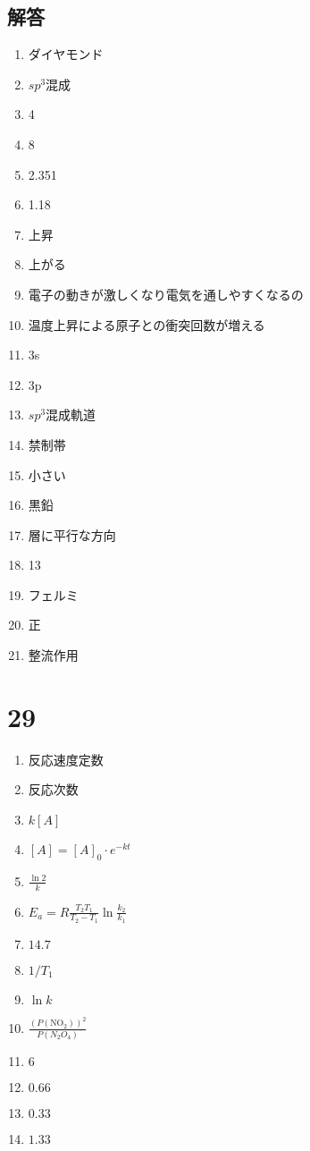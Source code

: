 \documentclass[dvipdfmx]{article}
\begin{document}
    \subsection*{解答}
      \begin{enumerate}
        \item ダイヤモンド 
        \item $sp^3$混成 
        \item 4
        \item 8
        \item 2.351
        \item 1.18
        \item 上昇
        \item 上がる
        \item 電子の動きが激しくなり電気を通しやすくなるの
        \item 温度上昇による原子との衝突回数が増える
        \item 3s
        \item 3p
        \item $sp^3$混成軌道
        \item 禁制帯
        \item 小さい
        \item 黒鉛
        \item 層に平行な方向
        \item 13
        \item フェルミ
        \item 正
        \item 整流作用
      \end{enumerate}
      \section*{29}
        \begin{enumerate}
          \item 反応速度定数
          \item 反応次数
          \item $k[A]$
          \item $[A] = [A]_0 \cdot e^{-kt}$
          \item $\frac{\ln 2}{k}$
          \item $E_a = R\frac{T_2 T_1}{T_2 - T_1} \ln \frac{k_2}{k_1}$
          \item $14.7$
          \item $1/T_1$
          \item $\ln k$
          \item $\frac{(P(\mathrm{NO_2}))^2}{P(N_2O_4)}$
          \item $6$
          \item $0.66$
          \item $0.33$
          \item $1.33$
        \end{enumerate}
\end{document}
